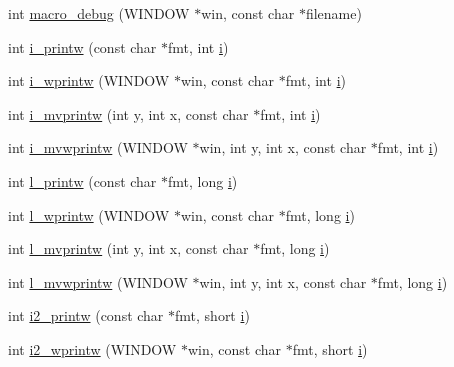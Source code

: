 \begin{DoxyCompactItemize}
\item 
int \hyperlink{C-macros_8c_ad39de37428ca946dfb31dbcf70b74b74}{macro\+\_\+debug} (W\+I\+N\+D\+OW $\ast$win, const char $\ast$filename)
\item 
int \hyperlink{C-macros_8c_a49f96e50b927c6cc42f2f7b3c4e25a2a}{i\+\_\+printw} (const char $\ast$fmt, int \hyperlink{intro__blas1_83_8txt_a8ba82a50c0c2c12d5f6a77f7e4651c0b}{i})
\item 
int \hyperlink{C-macros_8c_a8e0a315d5abc4f7b87f2b272c20d866d}{i\+\_\+wprintw} (W\+I\+N\+D\+OW $\ast$win, const char $\ast$fmt, int \hyperlink{intro__blas1_83_8txt_a8ba82a50c0c2c12d5f6a77f7e4651c0b}{i})
\item 
int \hyperlink{C-macros_8c_aeb5fc07bdb9b6670a11c4d74fd32ccf8}{i\+\_\+mvprintw} (int y, int x, const char $\ast$fmt, int \hyperlink{intro__blas1_83_8txt_a8ba82a50c0c2c12d5f6a77f7e4651c0b}{i})
\item 
int \hyperlink{C-macros_8c_a67cef3b1074a38caaa2f8db9b2f953b5}{i\+\_\+mvwprintw} (W\+I\+N\+D\+OW $\ast$win, int y, int x, const char $\ast$fmt, int \hyperlink{intro__blas1_83_8txt_a8ba82a50c0c2c12d5f6a77f7e4651c0b}{i})
\item 
int \hyperlink{C-macros_8c_a438f19725af6b5016916144895acf478}{l\+\_\+printw} (const char $\ast$fmt, long \hyperlink{intro__blas1_83_8txt_a8ba82a50c0c2c12d5f6a77f7e4651c0b}{i})
\item 
int \hyperlink{C-macros_8c_af6c94cd0fe4d153ee0b562bc2140c84a}{l\+\_\+wprintw} (W\+I\+N\+D\+OW $\ast$win, const char $\ast$fmt, long \hyperlink{intro__blas1_83_8txt_a8ba82a50c0c2c12d5f6a77f7e4651c0b}{i})
\item 
int \hyperlink{C-macros_8c_a958fd7e4d13c3ae6f4a8c249309d6b10}{l\+\_\+mvprintw} (int y, int x, const char $\ast$fmt, long \hyperlink{intro__blas1_83_8txt_a8ba82a50c0c2c12d5f6a77f7e4651c0b}{i})
\item 
int \hyperlink{C-macros_8c_a5daab34ebd2f1b9e9c30e70f68b9f634}{l\+\_\+mvwprintw} (W\+I\+N\+D\+OW $\ast$win, int y, int x, const char $\ast$fmt, long \hyperlink{intro__blas1_83_8txt_a8ba82a50c0c2c12d5f6a77f7e4651c0b}{i})
\item 
int \hyperlink{C-macros_8c_af9bd28267a2b2f23bc7f8e1a3c9a88f7}{i2\+\_\+printw} (const char $\ast$fmt, short \hyperlink{intro__blas1_83_8txt_a8ba82a50c0c2c12d5f6a77f7e4651c0b}{i})
\item 
int \hyperlink{C-macros_8c_acc4cfd26a85fbdf72a2f2f70c54aff7e}{i2\+\_\+wprintw} (W\+I\+N\+D\+OW $\ast$win, const char $\ast$fmt, short \hyperlink{intro__blas1_83_8txt_a8ba82a50c0c2c12d5f6a77f7e4651c0b}{i})

\end{DoxyCompactItemize}
